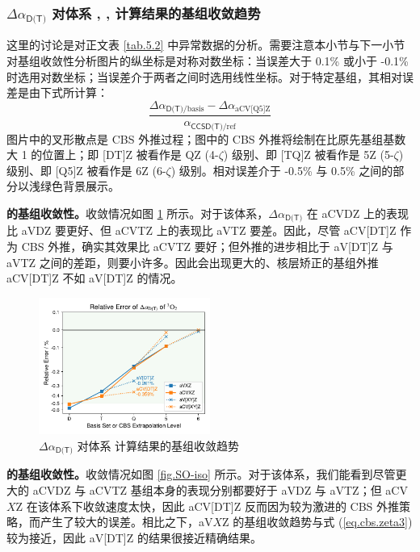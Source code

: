 \subsubsection{$\Delta \alpha_\textsf{D(T)}$ 对体系 , ,  计算结果的基组收敛趋势}
\label{sec.5.s4}

这里的讨论是对正文表 \ref{tab.5.2} 中异常数据的分析。需要注意本小节与下一小节对基组收敛性分析图片的纵坐标是对称对数坐标：当误差大于 0.1\% 或小于 -0.1\% 时选用对数坐标；当误差介于两者之间时选用线性坐标。对于特定基组，其相对误差是由下式所计算：
\begin{equation*}
    \frac{\Delta \alpha_{\textsf{D(T)} / \text{basis}} - \Delta \alpha_{\text{aCV[Q5]Z}}}{\alpha_{\textsf{CCSD(T)} / \text{ref}}}
\end{equation*}
图片中的叉形散点是 CBS 外推过程；图中的 CBS 外推将绘制在比原先基组基数大 1 的位置上；即 [DT]Z 被看作是 QZ (4-$\zeta$) 级别、即 [TQ]Z 被看作是 5Z (5-$\zeta$) 级别、即 [Q5]Z 被看作是 6Z (6-$\zeta$) 级别。相对误差介于 -0.5\% 与 0.5\% 之间的部分以浅绿色背景展示。

\textbf{ 的基组收敛性。}收敛情况如图 \ref{fig.O2-iso} 所示。对于该体系，$\Delta \alpha_\textsf{D(T)}$ 在 aCVDZ 上的表现比 aVDZ 要更好、但 aCVTZ 上的表现比 aVTZ 要差。因此，尽管 aCV[DT]Z 作为 CBS 外推，确实其效果比 aCVTZ 要好；但外推的进步相比于 aV[DT]Z 与 aVTZ 之间的差距，则要小许多。因此会出现更大的、核层矫正的基组外推 aCV[DT]Z 不如 aV[DT]Z 的情况。

\begin{figure}[ht]
    \centering
    \caption{$\Delta \alpha_\textsf{D(T)}$ 对体系  计算结果的基组收敛趋势}
    \label{fig.O2-iso}
    \includegraphics[width=0.5\textwidth]{assets/O2-iso.pdf}
\end{figure}

\textbf{ 的基组收敛性。}收敛情况如图 \ref{fig.SO-iso} 所示。对于该体系，我们能看到尽管更大的 aCVDZ 与 aCVTZ 基组本身的表现分别都要好于 aVDZ 与 aVTZ；但 aCV$X$Z 在该体系下收敛速度太快，因此 aCV[DT]Z 反而因为较为激进的 CBS 外推策略，而产生了较大的误差。相比之下，aV$X$Z 的基组收敛趋势与式 (\ref{eq.cbs.zeta3}) 较为接近，因此 aV[DT]Z 的结果很接近精确结果。

